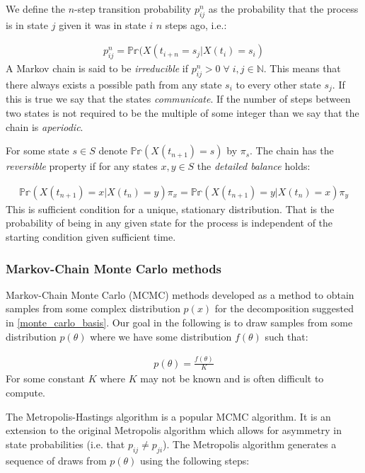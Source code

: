 \documentclass[11pt]{article} %
\begin{document}
We define the $n$-step transition probability $p_{ij}^n$ as the probability that the process is in state $j$ given it was in state $i$ $n$ steps ago, i.e.:

\begin{align}
p_{ij}^n = \mathbb{Pr}(X(t_{i+n} = s_j | X(t_i) = s_i)
\end{align}
A Markov chain is said to be \emph{irreducible} if $p_{ij}^n > 0 \; \forall \; i,j \in \mathbb{N}$. This means that there always exists a possible path from any state $s_i$ to every other state $s_j$. If this is true we say that the states \emph{communicate}. If the number of steps between two states is not required to be the multiple of some integer than we say that the chain is \emph{aperiodic}.

For some state $s \in S$ denote $ \mathbb{Pr}(X(t_{n+1}) = s)$ by $\pi_s$. The chain has the \emph{reversible} property if for any states $x, y \in S$ the \emph{detailed balance} holds:

\begin{align}
 \mathbb{Pr}(X(t_{n+1}) = x | X(t_n) = y)  \pi_x  =  \mathbb{Pr}(X(t_{n+1}) = y | X(t_n) = x) \pi_y
\end{align}
This is sufficient condition for a unique, stationary distribution. That is the probability of being in any given state for the process is independent of the starting condition given sufficient time.

\subsubsection{Markov-Chain Monte Carlo methods}
Markov-Chain Monte Carlo (MCMC) methods developed as a method to obtain samples from some complex distribution $p(x)$ for the decomposition suggested in \eqref{monte_carlo_basis}. Our goal in the following is to draw samples from some distribution $p(\theta)$ where we have some distribution $f(\theta)$ such that:

\begin{align}
p(\theta) = \frac{f(\theta)}{K} 
\end{align}
For some constant $K$ where $K$ may not be known and is often difficult to compute.

The Metropolis-Hastings algorithm \cite{HastingsMonteCarloSampling} is a popular MCMC algorithm. It is an extension to the original Metropolis algorithm which allows for asymmetry in state probabilities (i.e. that $p_{ij} \neq p_{ji}$). The Metropolis algorithm \cite{MetropolisMonteCarloMethod1949} \cite{MetropolisEquationStateCalculations1953} generates a sequence of draws from $p(\theta)$ using the following steps:
\end{document}
